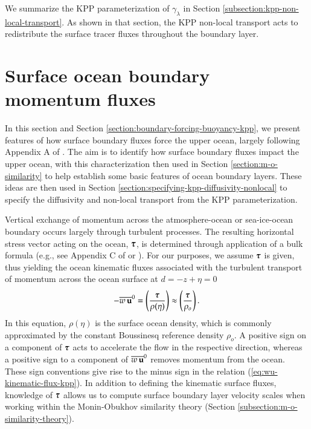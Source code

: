 We summarize the KPP parameterization of $\gamma_{\lambda}$ in Section
\ref{subsection:kpp-non-local-transport}.  As shown in that section,
the KPP non-local transport acts to redistribute the surface tracer
fluxes throughout the boundary layer.  



\section{Surface ocean boundary momentum fluxes}
\label{section:boundary-forcing-momentum-kpp}

In this section and Section
\ref{section:boundary-forcing-buoyancy-kpp}, we present features of
how surface boundary fluxes force the upper ocean, largely following
Appendix A of \cite{LargeKPP}.  The aim is to identify how surface
boundary fluxes impact the upper ocean, with this characterization
then used in Section \ref{section:m-o-similarity} to help establish
some basic features of ocean boundary layers.  These ideas are then
used in Section \ref{section:specifying-kpp-diffusivity-nonlocal} to
specify the diffusivity and non-local transport from the KPP
parameterization.

Vertical exchange of momentum across the atmosphere-ocean or
sea-ice-ocean boundary occurs largely through turbulent processes.
The resulting horizontal stress vector acting on the ocean, $\mbox{\boldmath $\tau$}$,
is determined through application of a bulk formula (e.g., see
Appendix C of \cite{CORE_NYF} or \cite{LargeYeager2009}). For our
purposes, we assume $\mbox{\boldmath $\tau$}$ is given, thus yielding the ocean
kinematic fluxes associated with the turbulent transport of momentum
across the ocean surface at $d = -z + \eta = 0$
\begin{equation}
 -\overline{w \, {\bf u}}^{0} 
 = \left( \frac{ \mbox{\boldmath $\tau$} }{\rho(\eta)} \right) \approx \left( \frac{ \mbox{\boldmath $\tau$} }{\rho_{o}} \right).
\label{eq:wu-kinematic-flux-kpp}
\end{equation} 
In this equation, $\rho(\eta)$ is the surface ocean density, which is
commonly approximated by the constant Boussinesq reference density
$\rho_{o}$.  A positive sign on a component of $\mbox{\boldmath $\tau$}$ acts to
accelerate the flow in the respective direction, whereas a positive
sign to a component of $\overline{w \, {\bf u}}^{0}$ removes
momentum from the ocean.  These sign conventions give rise to the
minus sign in the relation (\ref{eq:wu-kinematic-flux-kpp}). In
addition to defining the kinematic surface fluxes, knowledge of
$\mbox{\boldmath $\tau$}$ allows us to compute surface boundary layer velocity scales
when working within the Monin-Obukhov similarity theory (Section
\ref{subsection:m-o-similarity-theory}).

